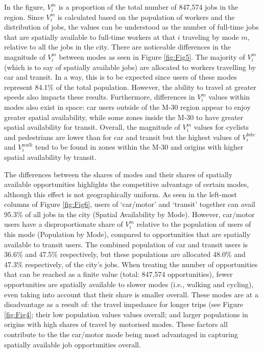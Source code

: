 \documentclass[10pt,letterpaper]{article}
\begin{document}
In the figure, \(V_i^m\) is a proportion of the total number of 847,574
jobs in the region. Since \(V_i^m\) is calculated based on the
population of workers and the distribution of jobs, the values can be
understood as the number of full-time jobs that are spatially available
to full-time workers at that \(i\) traveling by mode \(m\), relative to
all the jobs in the city. There are noticeable differences in the
magnitude of \(V_i^m\) between modes as seen in Figure \ref{fig:Fig5}.
The majority of \(V_i^m\) (which is to say of spatially available jobs)
are allocated to workers travelling by car and transit. In a way, this
is to be expected since users of these modes represent 84.1\% of the
total population. However, the ability to travel at greater speeds also
impacts these results. Furthermore, differences in \(V_i^m\) values
within modes also exist in space: car users outside of the M-30 region
appear to enjoy greater spatial availability, while some zones inside
the M-30 to have greater spatial availability for transit. Overall, the
magnitude of \(V_i^m\) values for cyclists and pedestrians are lower
than for car and transit but the highest values of \(V_i^{bike}\) and
\(V_i^{walk}\) tend to be found in zones within the M-30 and origins
with higher spatial availability by transit.

The differences between the shares of modes and their shares of
spatially available opportunities highlights the competitive advantage
of certain modes, although this effect is not geographically uniform. As
seen in the left-most columns of Figure \ref{fig:Fig6}, users of
`car/motor' and `transit' together can avail 95.3\% of all jobs in the
city (Spatial Availability by Mode). However, car/motor users have a
disproportionate share of \(V_i^m\) relative to the population of users
of this mode (Population by Mode), compared to opportunities that are
spatially available to transit users. The combined population of car and
transit users is 36.6\% and 47.5\% respectively, but these populations
are allocated 48.0\% and 47.3\% respectively, of the city's jobs. When
treating the number of opportunities that can be reached as a finite
value (total: 847,574 opportunities), fewer opportunities are spatially
available to slower modes (i.e., walking and cycling), even taking into
account that their share is smaller overall. These modes are at a
disadvantage as a result of: the travel impedance for longer trips (see
Figure \ref{fig:Fig4}; their low population values values overall; and
larger populations in origins with high shares of travel by motorised
modes. These factors all contribute to the the car/motor mode being most
advantaged in capturing spatially available job opportunities overall.
\end{document}
